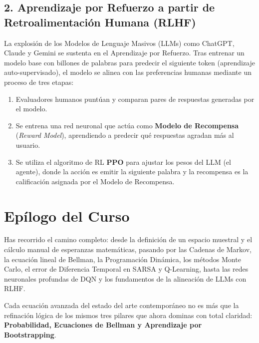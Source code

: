 \subsection{2. Aprendizaje por Refuerzo a partir de Retroalimentación Humana (RLHF)}
La explosión de los Modelos de Lenguaje Masivos (LLMs) como ChatGPT, Claude y Gemini se sustenta en el Aprendizaje por Refuerzo. Tras entrenar un modelo base con billones de palabras para predecir el siguiente token (aprendizaje auto-supervisado), el modelo se alinea con las preferencias humanas mediante un proceso de tres etapas:
\begin{enumerate}
  \item Evaluadores humanos puntúan y comparan pares de respuestas generadas por el modelo.
  \item Se entrena una red neuronal que actúa como \textbf{Modelo de Recompensa} (\textit{Reward Model}), aprendiendo a predecir qué respuestas agradan más al usuario.
  \item Se utiliza el algoritmo de RL \textbf{PPO} para ajustar los pesos del LLM (el agente), donde la acción es emitir la siguiente palabra y la recompensa es la calificación asignada por el Modelo de Recompensa.
\end{enumerate}

\section{Epílogo del Curso}
Has recorrido el camino completo: desde la definición de un espacio muestral y el cálculo manual de esperanzas matemáticas, pasando por las Cadenas de Markov, la ecuación lineal de Bellman, la Programación Dinámica, los métodos Monte Carlo, el error de Diferencia Temporal en SARSA y Q-Learning, hasta las redes neuronales profundas de DQN y los fundamentos de la alineación de LLMs con RLHF.

Cada ecuación avanzada del estado del arte contemporáneo no es más que la refinación lógica de los mismos tres pilares que ahora dominas con total claridad: \textbf{Probabilidad, Ecuaciones de Bellman y Aprendizaje por Bootstrapping}.

